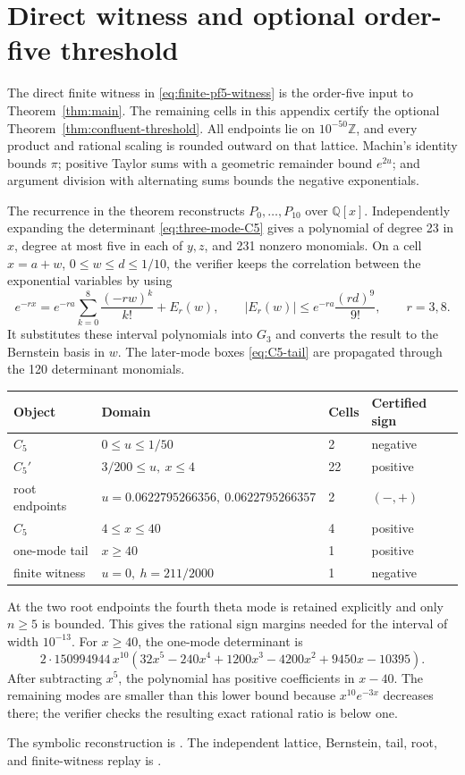 \section{Direct witness and optional order-five threshold}\label{app:pf5-threshold}

The direct finite witness in \eqref{eq:finite-pf5-witness} is the order-five
input to Theorem~\ref{thm:main}. The remaining cells in this appendix certify
the optional Theorem~\ref{thm:confluent-threshold}. All endpoints lie on
\(10^{-50}\mathbb Z\), and every product and rational scaling is rounded
outward on that lattice. Machin's identity bounds \(\pi\); positive Taylor
sums with a geometric remainder bound \(e^{2u}\); and argument division with
alternating sums bounds the negative exponentials.

The recurrence in the theorem reconstructs \(P_0,\ldots,P_{10}\) over
\(\mathbb Q[x]\). Independently expanding the determinant
\eqref{eq:three-mode-C5} gives a polynomial of degree 23 in \(x\), degree
at most five in each of \(y,z\), and 231 nonzero monomials. On a cell
\(x=a+w\), \(0\leq w\leq d\leq1/10\), the verifier keeps the correlation
between the exponential variables by using
\[
 e^{-rx}=e^{-ra}\sum_{k=0}^8\frac{(-rw)^k}{k!}+E_r(w),
 \qquad
 |E_r(w)|\leq e^{-ra}\frac{(rd)^9}{9!},\qquad r=3,8.
\]
It substitutes these interval polynomials into \(G_3\) and converts the result
to the Bernstein basis in \(w\). The later-mode boxes
\eqref{eq:C5-tail} are propagated through the 120 determinant monomials.

\begin{center}
\small
\begin{tabular}{@{}llll@{}}
\toprule
Object & Domain & Cells & Certified sign \\
\midrule
\(C_5\) & \(0\leq u\leq1/50\) & 2 & negative \\
\(C_5'\) & \(3/200\leq u,\ x\leq4\) & 22 & positive \\
root endpoints & \(u=0.0622795266356,\ 0.0622795266357\) & 2 & \((-,+)\) \\
\(C_5\) & \(4\leq x\leq40\) & 4 & positive \\
one-mode tail & \(x\geq40\) & 1 & positive \\
finite witness & \(u=0,\ h=211/2000\) & 1 & negative \\
\bottomrule
\end{tabular}
\end{center}

At the two root endpoints the fourth theta mode is retained explicitly and
only \(n\geq5\) is bounded. This gives the rational sign margins needed for
the interval of width \(10^{-13}\). For \(x\geq40\), the one-mode determinant
is
\[
 2\cdot150994944\,x^{10}
 (32x^5-240x^4+1200x^3-4200x^2+9450x-10395).
\]
After subtracting \(x^5\), the polynomial has positive coefficients in
\(x-40\). The remaining modes are smaller than this lower bound because
\(x^{10}e^{-3x}\) decreases there; the verifier checks the resulting exact
rational ratio is below one.

The symbolic reconstruction is
. The independent lattice,
Bernstein, tail, root, and finite-witness replay is
.

